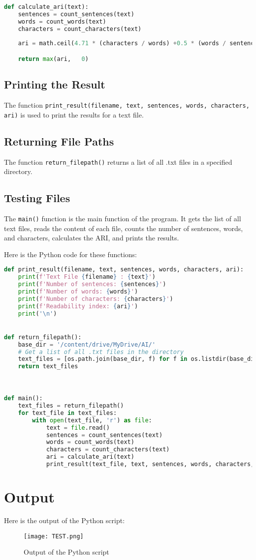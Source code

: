 \documentclass{article}
\begin{document}
\begin{lstlisting}[language=Python]
def calculate_ari(text):
    sentences = count_sentences(text)
    words = count_words(text)
    characters = count_characters(text)
   
    ari = math.ceil(4.71 * (characters / words) +0.5 * (words / sentences) - 21.43)

    return max(ari,   0)


\end{lstlisting}
\subsection{Printing the Result}
The function \texttt{print\_result(filename, text, sentences, words, characters, ari)} is used to print the results for a text file. 

\subsection{Returning File Paths}
The function \texttt{return\_filepath()} returns a list of all .txt files in a specified directory.

\subsection{Testing Files}
The \texttt{main()} function is the main function of the program. It gets the list of all text files, reads the content of each file, counts the number of sentences, words, and characters, calculates the ARI, and prints the results.

Here is the Python code for these functions:

\begin{lstlisting}[language=Python]
def print_result(filename, text, sentences, words, characters, ari):
    print(f'Text File {filename} : {text}')
    print(f'Number of sentences: {sentences}')
    print(f'Number of words: {words}')
    print(f'Number of characters: {characters}')
    print(f'Readability index: {ari}')
    print('\n')


def return_filepath():
    base_dir = '/content/drive/MyDrive/AI/'
    # Get a list of all .txt files in the directory
    text_files = [os.path.join(base_dir, f) for f in os.listdir(base_dir) if f.endswith('.txt')]
    return text_files



def main():
    text_files = return_filepath()
    for text_file in text_files:
        with open(text_file, 'r') as file:
            text = file.read()
            sentences = count_sentences(text)
            words = count_words(text)
            characters = count_characters(text)
            ari = calculate_ari(text)
            print_result(text_file, text, sentences, words, characters, ari)
\end{lstlisting}
\section{Output}
Here is the output of the Python script:
 \begin{figure}[H]
 \texttt{[image: TEST.png]}
 \caption{Output of the Python script}
 \end{figure}
\end{document}
